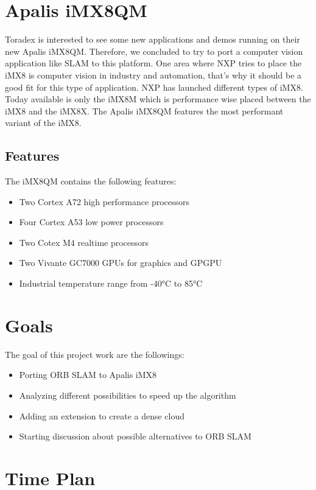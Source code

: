 \documentclass[11pt,a4paper,titlepage,oneside]{report}
\begin{document}
\section{Apalis iMX8QM}

Toradex is interested to see some new applications and demos running on their new Apalis iMX8QM. Therefore, we concluded to try to port a computer vision application like SLAM to this platform. One area where NXP tries to place the iMX8 is computer vision in industry and automation, that's why it should be a good fit for this type of application. NXP has launched different types of iMX8. Today available is only the iMX8M which is performance wise placed between the iMX8 and the iMX8X. The Apalis iMX8QM features the most performant variant of the iMX8.

\subsection{Features}

The iMX8QM contains the following features:
\begin{itemize}
  \item Two Cortex A72 high performance processors
  \item Four Cortex A53 low power processors
  \item Two Cotex M4 realtime processors 
  \item Two Vivante GC7000 GPUs for graphics and GPGPU
  \item Industrial temperature range from -40°C to 85°C
\end{itemize}

\section{Goals}
The goal of this project work are the followings:
\begin{itemize}
\item Porting ORB SLAM to Apalis iMX8
\item Analyzing different possibilities to speed up the algorithm
\item Adding an extension to create a dense cloud
\item Starting discussion about possible alternatives to ORB SLAM
\end{itemize}

\section{Time Plan}
\end{document}

